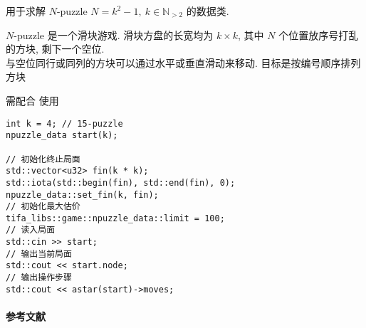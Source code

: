 用于求解 \(N\)-puzzle \(N=k^2-1,~k\in\mathbb{N}_{>2}\) 的数据类.

\(N\)-puzzle 是一个滑块游戏. 滑块方盘的长宽均为 \(k\times k\), 其中 \(N\) 个位置放序号打乱的方块, 剩下一个空位. \\ 与空位同行或同列的方块可以通过水平或垂直滑动来移动. 目标是按编号顺序排列方块

需配合  使用

\begin{verbatim}
int k = 4; // 15-puzzle
npuzzle_data start(k);

// 初始化终止局面
std::vector<u32> fin(k * k);
std::iota(std::begin(fin), std::end(fin), 0);
npuzzle_data::set_fin(k, fin);
// 初始化最大估价
tifa_libs::game::npuzzle_data::limit = 100;
// 读入局面
std::cin >> start;
// 输出当前局面
std::cout << start.node;
// 输出操作步骤
std::cout << astar(start)->moves;
\end{verbatim}

\paragraph{参考文献} \cite{johnson1879notes} \cite{archer1999modern}